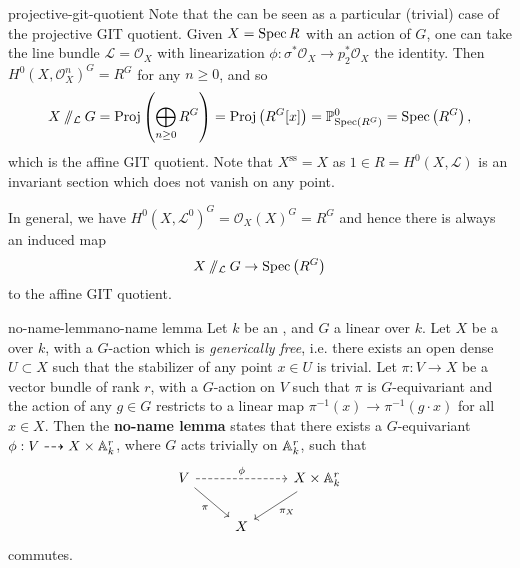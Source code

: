     
    

\begin{example}{projective-git-quotient}
    Note that the  can be seen as a particular (trivial) case of the projective GIT quotient. Given $X = \Spec R$ with an action of $G$, one can take the line bundle $\mathcal{L} = \mathcal{O}_X$ with linearization $\phi : \sigma^* \mathcal{O}_X \to p_2^* \mathcal{O}_X$ the identity. Then $H^0(X, \mathcal{O}_X^n)^G = R^G$ for any $n \ge 0$, and so
    \[ X \sslash_{\mathcal{L}} G = \operatorname{Proj} \left( \bigoplus_{n \ge 0} R^G \right) = \operatorname{Proj} \left( R^G[x] \right) = \PP^0_{\Spec \left( R^G \right) } = \Spec\left( R^G \right) , \]
    which is the affine GIT quotient. Note that $X^\text{ss} = X$ as $1 \in R = H^0(X, \mathcal{L})$ is an invariant section which does not vanish on any point.
    
    In general, we have $H^0(X, \mathcal{L}^0)^G = \mathcal{O}_X(X)^G = R^G$ and hence there is always an induced map
    \[ X \sslash_{\mathcal{L}} G \to \Spec\left( R^G \right) \]
    to the affine GIT quotient.
\end{example}

\begin{topic}{no-name-lemma}{no-name lemma}
    Let $k$ be an , and $G$ a linear  over $k$. Let $X$ be a  over $k$, with a $G$-action which is \textit{generically free}, i.e. there exists an open dense $U \subset X$ such that the stabilizer of any point $x \in U$ is trivial. Let $\pi : V \to X$ be a vector bundle of rank $r$, with a $G$-action on $V$ such that $\pi$ is $G$-equivariant and the action of any $g \in G$ restricts to a linear map $\pi^{-1}(x) \to \pi^{-1}(g \cdot x)$ for all $x \in X$. Then the \textbf{no-name lemma} states that there exists a $G$-equivariant  $\phi : V \dashrightarrow X \times \AA^r_k$, where $G$ acts trivially on $\AA^r_k$, such that
    \[ \begin{tikzcd}
        V \arrow[dashed]{rr}{\phi} \arrow[swap]{rd}{\pi} && X \times \AA^r_k \arrow{dl}{\pi_X} \\
        & X &
    \end{tikzcd} \]
    commutes.
\end{topic}

